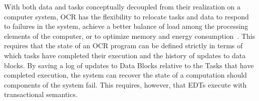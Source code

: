 With both data and tasks conceptually decoupled from their realization
on a computer system, OCR has the flexibility to relocate tasks and data
to respond to failures in the system, achieve a better balance of load
among the processing elements of the computer, or to optimize memory
and energy consumption~\cite{GZCS10,Guo10,CTBCCGYS13,SbBS14}.
This requires that the state of an OCR program can be defined
strictly in terms of which tasks have completed their execution
and the history of updates to data blocks. By saving a log of updates to Data Blocks
relative to the Tasks that have completed execution, the system can recover
the state of a computation should components of the system fail.  This requires,
however, that EDTs execute with transactional semantics.

